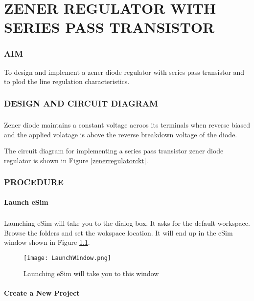 \chapter{ZENER REGULATOR WITH SERIES PASS TRANSISTOR}

\subsection*{AIM}
To design and implement a zener diode regulator with series pass transistor and to plod the line regulation characteristics.

\subsection*{DESIGN AND CIRCUIT DIAGRAM}
\paragraph{}
Zener diode maintains a constant voltage acroos its terminals when reverse biased and the applied volatage is above the reverse breakdown voltage of the diode.

The circuit diagram for implementing a series pass transistor zener diode regulator is shown in Figure \ref{zenerregulatorckt}.



\subsection*{PROCEDURE}

\subsubsection{Launch eSim}

\paragraph{}
 Launching eSim will take you to the dialog box. It asks for the default workspace. Browse the folders and set the wokspace location. It will end up in the eSim window shown in Figure \ref{LaunchWindow}.
 
\begin{figure}[H]
\centering
\texttt{[image: LaunchWindow.png]}
\caption{Launching eSim will take you to this window}
\label{LaunchWindow}
\end{figure}

\subsubsection{Create a New Project}

